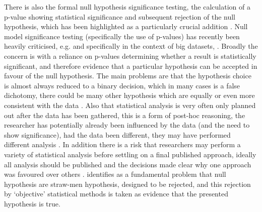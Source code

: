 There is also the formal null hypothesis significance testing, the calculation of a p-value showing statistical significance and subsequent rejection of the null hypothesis, which has been highlighted as a particularly crucial addition \citet{Timpson2015199}. Null model significance testing (specifically the use of p-values) has recently been heavily criticised, e.g. \citet{doi:10.1080/00031305.2016.1154108, Gelman:2016fk, doi:10.1080/00220973.1993.10806591} and specifically in the context of big datasets, \citet{doi:10.1177/2053951715602495}. Broadly the concern is with a reliance on p-values determining whether a result is statistically significant, and therefore evidence that a particular hypothesis can be accepted in favour of the null hypothesis. The main problems are that the hypothesis choice is almost always reduced to a binary decision, which in many cases is a false dichotomy, there could be many other hypothesis which are equally or even more consistent with the data \citep{doi:10.1080/00031305.2016.1154108}. Also that statistical analysis is very often only planned out after the data has been gathered, this is a form of post-hoc reasoning, the researcher has potentially already been influenced by the data (and the need to show significance), had the data been different, they may have performed different analysis \citep{Gelman:2016fk}. In addition there is a risk that researchers may perform a variety of statistical analysis before settling on a final published approach, ideally all analysis should be published and the decisions made clear why one approach was favoured over others \citep{doi:10.1080/00031305.2016.1154108}. \citet{Gelman:2016fk} identifies as a fundamental problem that null hypothesis are straw-men hypothesis, designed to be rejected, and this rejection by `objective' statistical methods is taken as evidence that the presented hypothesis is true. 

